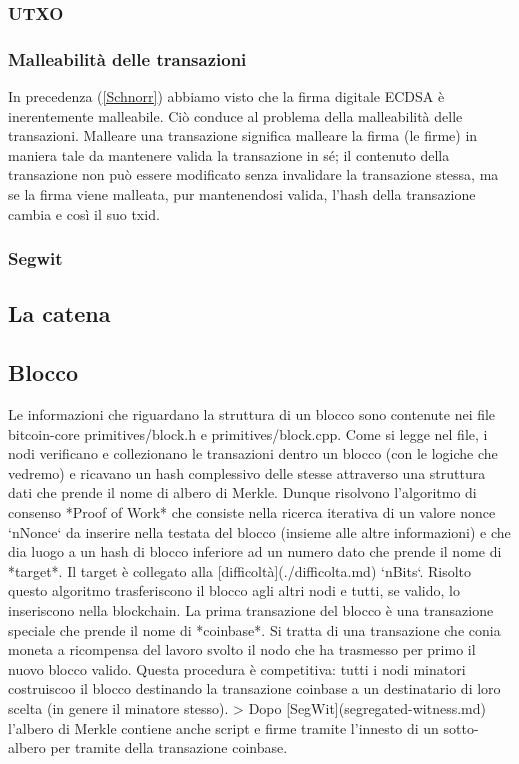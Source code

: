 \documentclass{book}
\theoremstyle{definition}
\begin{document}
\subsubsection{UTXO}
\subsubsection{Malleabilità delle transazioni}
In precedenza (\ref{Schnorr}) abbiamo visto che la firma digitale ECDSA è inerentemente malleabile.
Ciò conduce al problema della malleabilità delle transazioni.
Malleare una transazione significa malleare la firma (le firme) in maniera tale da mantenere valida la transazione in sé;
il contenuto della transazione non può essere modificato senza invalidare la transazione stessa, ma se la firma viene malleata, 
pur mantenendosi valida, l'hash della transazione cambia e così il suo txid.
\subsubsection{Segwit}

\newpage
\subsection{La catena}

\newpage
\subsection{Blocco}
Le informazioni che riguardano la struttura di un blocco sono contenute nei file bitcoin-core primitives/block.h e primitives/block.cpp.
Come si legge nel file, i nodi verificano e collezionano le transazioni dentro un blocco (con le logiche che vedremo) e ricavano un hash complessivo delle stesse attraverso una struttura dati che prende il nome di albero di Merkle.
Dunque risolvono l'algoritmo di consenso *Proof of Work* che consiste nella ricerca iterativa di un valore nonce `nNonce` da inserire nella testata del blocco (insieme alle altre informazioni) e che dia luogo a un hash di blocco inferiore ad un numero dato che prende il nome di *target*. Il target è collegato alla [difficoltà](./difficolta.md) `nBits`.
Risolto questo algoritmo trasferiscono il blocco agli altri nodi e tutti, se valido, lo inseriscono nella blockchain. La prima transazione del blocco è una transazione speciale che prende il nome di *coinbase*. Si tratta di una transazione che conia moneta a ricompensa del lavoro svolto il nodo che ha trasmesso per primo il nuovo blocco valido. Questa procedura è competitiva: tutti i nodi minatori costruiscoo il blocco destinando la transazione coinbase a un destinatario di loro scelta (in genere il minatore stesso).
> Dopo [SegWit](segregated-witness.md) l'albero di Merkle contiene anche script e firme tramite l'innesto di un sotto-albero per tramite della transazione coinbase.
\end{document}
